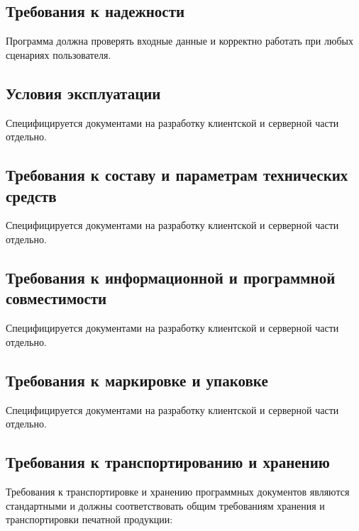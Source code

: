 \documentclass[techtask]{espd}
\begin{document}
\subsection{Требования к надежности}
Программа должна проверять входные данные и корректно работать при любых сценариях пользователя.

\subsection{Условия эксплуатации}
Специфицируется документами на разработку клиентской и серверной части отдельно.

\subsection{Требования к составу и параметрам технических средств}\label{subsection:requirements}
Специфицируется документами на разработку клиентской и серверной части отдельно.

\subsection{Требования к информационной и программной совместимости}
Специфицируется документами на разработку клиентской и серверной части отдельно.

\subsection{Требования к маркировке и упаковке}
Специфицируется документами на разработку клиентской и серверной части отдельно.

\subsection{Требования к транспортированию и хранению}
Требования к транспортировке и хранению программных документов являются стандартными и должны соответствовать общим требованиям хранения и транспортировки печатной продукции:
\end{document}
